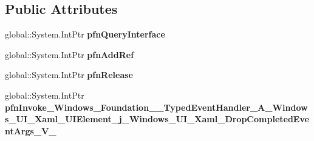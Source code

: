 \subsection*{Public Attributes}
\begin{DoxyCompactItemize}
\item 
\mbox{\label{struct_windows_1_1_foundation_1_1_typed_event_handler___a___windows___u_i___xaml___u_i_element__c6192b159f25e6e797ea21530cd542d3_ac5f8d9fdd4fa389748d82c0aa0d8070b}} 
global\+::\+System.\+Int\+Ptr {\bfseries pfn\+Query\+Interface}
\item 
\mbox{\label{struct_windows_1_1_foundation_1_1_typed_event_handler___a___windows___u_i___xaml___u_i_element__c6192b159f25e6e797ea21530cd542d3_ab2f6af806fbebec193ceb3d2d6839bee}} 
global\+::\+System.\+Int\+Ptr {\bfseries pfn\+Add\+Ref}
\item 
\mbox{\label{struct_windows_1_1_foundation_1_1_typed_event_handler___a___windows___u_i___xaml___u_i_element__c6192b159f25e6e797ea21530cd542d3_a1c580a96717952dae1f93cd3bb197ede}} 
global\+::\+System.\+Int\+Ptr {\bfseries pfn\+Release}
\item 
\mbox{\label{struct_windows_1_1_foundation_1_1_typed_event_handler___a___windows___u_i___xaml___u_i_element__c6192b159f25e6e797ea21530cd542d3_a66fd4a289de325a2d4da5ffe9193bfba}} 
global\+::\+System.\+Int\+Ptr {\bfseries pfn\+Invoke\+\_\+\+Windows\+\_\+\+Foundation\+\_\+\+\_\+\+Typed\+Event\+Handler\+\_\+\+A\+\_\+\+Windows\+\_\+\+U\+I\+\_\+\+Xaml\+\_\+\+U\+I\+Element\+\_\+j\+\_\+\+Windows\+\_\+\+U\+I\+\_\+\+Xaml\+\_\+\+Drop\+Completed\+Event\+Args\+\_\+\+V\+\_\+}
\end{DoxyCompactItemize}
